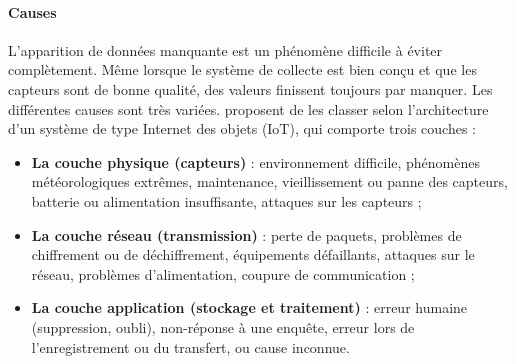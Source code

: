 \paragraph{Causes} 
L'apparition de données manquante est un phénomène difficile à éviter complètement. 
Même lorsque le système de collecte est bien conçu et que les capteurs sont de bonne qualité, des valeurs finissent toujours par manquer. 
Les différentes causes sont très variées. 
\cite{Adhikari_2023} proposent de les classer selon l’architecture d’un système de type Internet des objets (IoT), qui comporte trois couches :
\begin{itemize}
    \vspace{2mm}
    \item \textbf{La couche physique (capteurs)} : environnement difficile, phénomènes météorologiques extrêmes, maintenance, vieillissement ou panne des capteurs, batterie ou alimentation insuffisante, attaques sur les capteurs ;
    \vspace{2mm}
    \item \textbf{La couche réseau (transmission)} : perte de paquets, problèmes de chiffrement ou de déchiffrement, équipements défaillants, attaques sur le réseau, problèmes d’alimentation, coupure de communication ;
    \vspace{2mm}
    \item \textbf{La couche application (stockage et traitement)} : erreur humaine (suppression, oubli), non-réponse à une enquête, erreur lors de l’enregistrement ou du transfert, ou cause inconnue.
\end{itemize}


